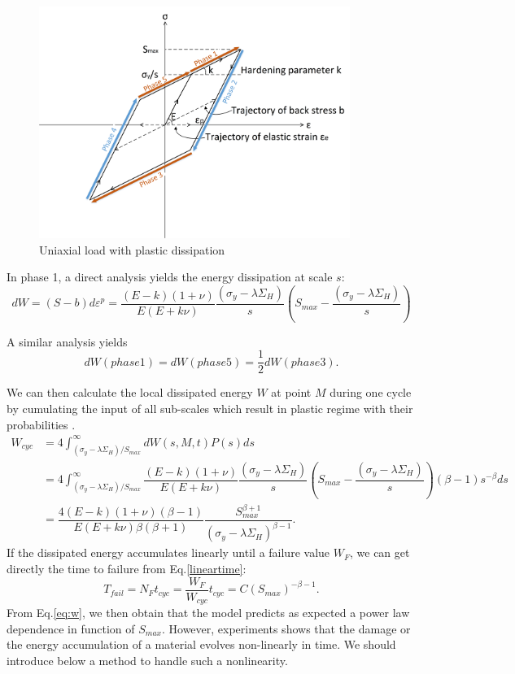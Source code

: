 \documentclass[3p,times,number,review]{elsarticle}
\begin{document}
\begin{figure}[!h]
	\centering
	\includegraphics[width=0.9\textwidth]{figures//backstress.png} 
	\caption{Uniaxial load with plastic dissipation}
	\label{backstress}
\end{figure}

In phase 1, a direct analysis yields the energy dissipation at scale $s$:
\begin{equation}dW=(S-b)d\varepsilon^p=\dfrac{(E-k)(1+\nu) }{E(E+k\nu)}\dfrac{ \left(\sigma_y-\lambda \Sigma_H\right)}{s}\left(S_{max}-\dfrac{ \left(\sigma_y-\lambda \Sigma_H\right)}{s}\right)
\label{dw}
\end{equation}

A similar analysis yields $$dW(phase 1)=dW(phase 5)=\dfrac{1}{2}dW(phase 3).$$

We can then calculate  the local dissipated energy $W$  at point $M$ during one cycle by cumulating the input of all sub-scales which result in plastic regime with their probabilities \cite{zepeng}.
\begin{equation}
\begin{split}
W_{cyc}&=4\int_{ \left(\sigma_y-\lambda \Sigma_H\right) /S_{max}}^{\infty}dW(s,M,t)P(s)ds
\\&=4\int_{ \left(\sigma_y-\lambda \Sigma_H\right) /S_{max}}^{\infty}\dfrac{(E-k)(1+\nu) }{E(E+k\nu)}\dfrac{ \left(\sigma_y-\lambda \Sigma_H\right)}{s}\left(S_{max}-\dfrac{ \left(\sigma_y-\lambda \Sigma_H\right)}{s}\right)\left( \beta-1\right) s^{-\beta}ds
\\&=\dfrac{4(E-k)(1+\nu)\left( \beta-1\right) }{ E(E+k\nu)\beta\left( \beta+1\right) }\dfrac{S_{max}^{\beta+1}}{ \left(\sigma_y-\lambda \Sigma_H\right)^{\beta-1}}.
\end{split}
\label{eq:w}
\end{equation}
 If the dissipated energy accumulates linearly until a failure value $W_F$, we can get directly the time to failure from Eq.\eqref{lineartime}:
\begin{equation}
T_{fail}=N_{F}t_{cyc}=\dfrac{W_F}{W_{cyc}}t_{cyc}=C(S_{max})^{-\beta-1}.
\label{lineartime}
\end{equation}
From Eq.\eqref{eq:w}, we then obtain that the model predicts as expected a power law dependence in function of $S_{max}$.
However, experiments shows that the damage or the energy accumulation of a material evolves non-linearly in time. We should introduce below a method to handle such a nonlinearity.
\end{document}
